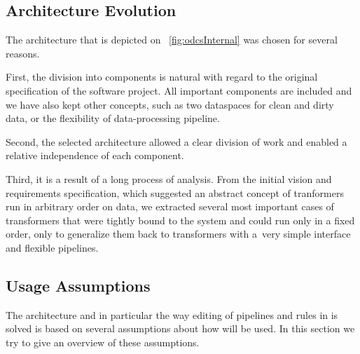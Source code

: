\subsection{Architecture Evolution}
The architecture that is depicted on \figurename~\ref{fig:odcsInternal} was chosen for several reasons.

First, the division into components is natural with regard to the original specification of the software project. All important components are included and we have also kept other concepts, such as two dataspaces for clean and dirty data, or the flexibility of data-processing pipeline.

Second, the selected architecture allowed a clear division of work and enabled a relative independence of each component.

Third, it is a result of a long process of analysis. From the initial vision and  requirements specification, which suggested an abstract concept of tranformers run in arbitrary order on data, we extracted several most important cases of transformers that were tightly bound to the system and could run only in a fixed order, only to generalize them back to transformers with a~very simple interface and flexible pipelines.

\subsection{Usage Assumptions}
The architecture and in particular the way editing of pipelines and rules  in \FE is solved is based on several assumptions about how \odcs will be used. In this section we try to give an overview of these assumptions.

